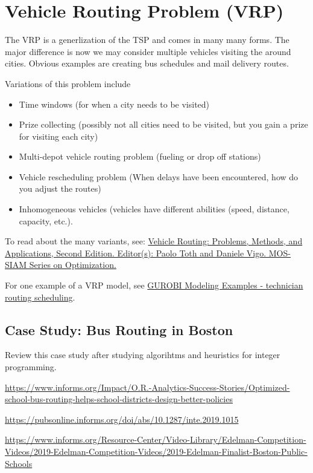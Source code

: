 \section{Vehicle Routing Problem (VRP)}
The VRP is a generlization of the TSP and comes in many many forms.  The major difference is now we may consider multiple vehicles visiting the around cities.
Obvious examples are creating bus schedules and mail delivery routes.  

Variations of this problem include
\begin{itemize}
\item Time windows (for when a city needs to be visited)
\item Prize collecting (possibly not all cities need to be visited, but you gain a prize for visiting each city)
\item Multi-depot vehicle routing problem (fueling or drop off stations)
\item Vehicle rescheduling problem (When delays have been encountered, how do you adjust the routes)
\item Inhomogeneous vehicles (vehicles have different abilities (speed, distance, capacity, etc.).
\end{itemize}

To read about the many variants, see:
\href{https://doi-org.ezproxy.lib.vt.edu/10.1137/1.9781611973594}{
Vehicle Routing: Problems, Methods, and Applications, Second Edition. 
Editor(s): Paolo Toth and Daniele Vigo.  MOS-SIAM Series on Optimization.}


For one example of a VRP model, see \href{https://github.com/Gurobi/modeling-examples/tree/master/technician_routing_scheduling}{GUROBI Modeling Examples - technician routing scheduling}.


\subsection{Case Study: Bus Routing in Boston}
Review this case study after studying algorihtms and heuristics for integer programming.



\url{https://www.informs.org/Impact/O.R.-Analytics-Success-Stories/Optimized-school-bus-routing-helps-school-districts-design-better-policies}

\url{https://pubsonline.informs.org/doi/abs/10.1287/inte.2019.1015}

\url{https://www.informs.org/Resource-Center/Video-Library/Edelman-Competition-Videos/2019-Edelman-Competition-Videos/2019-Edelman-Finalist-Boston-Public-Schools}


